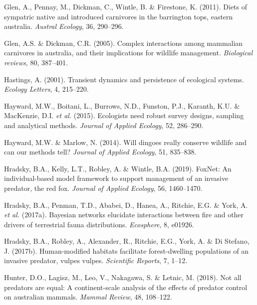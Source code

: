 \documentclass[]{elsarticle} %
\begin{document}
\leavevmode\hypertarget{ref-glen2011}{}%
Glen, A., Pennay, M., Dickman, C., Wintle, B. \& Firestone, K. (2011). Diets of sympatric native and introduced carnivores in the barrington tops, eastern australia. \emph{Austral Ecology}, 36, 290--296.

\leavevmode\hypertarget{ref-glen2005}{}%
Glen, A.S. \& Dickman, C.R. (2005). Complex interactions among mammalian carnivores in australia, and their implications for wildlife management. \emph{Biological reviews}, 80, 387--401.

\leavevmode\hypertarget{ref-hastings2001}{}%
Hastings, A. (2001). Transient dynamics and persistence of ecological systems. \emph{Ecology Letters}, 4, 215--220.

\leavevmode\hypertarget{ref-hayward2015}{}%
Hayward, M.W., Boitani, L., Burrows, N.D., Funston, P.J., Karanth, K.U. \& MacKenzie, D.I. \emph{et al.} (2015). Ecologists need robust survey designs, sampling and analytical methods. \emph{Journal of Applied Ecology}, 52, 286--290.

\leavevmode\hypertarget{ref-https:ux2fux2fdoi.orgux2f10.1111ux2f1365-2664.12250}{}%
Hayward, M.W. \& Marlow, N. (2014). Will dingoes really conserve wildlife and can our methods tell? \emph{Journal of Applied Ecology}, 51, 835--838.

\leavevmode\hypertarget{ref-hradsky2019foxnet}{}%
Hradsky, B.A., Kelly, L.T., Robley, A. \& Wintle, B.A. (2019). FoxNet: An individual-based model framework to support management of an invasive predator, the red fox. \emph{Journal of Applied Ecology}, 56, 1460--1470.

\leavevmode\hypertarget{ref-hradsky2017bayesian}{}%
Hradsky, B.A., Penman, T.D., Ababei, D., Hanea, A., Ritchie, E.G. \& York, A. \emph{et al.} (2017a). Bayesian networks elucidate interactions between fire and other drivers of terrestrial fauna distributions. \emph{Ecosphere}, 8, e01926.

\leavevmode\hypertarget{ref-hradsky2017human}{}%
Hradsky, B.A., Robley, A., Alexander, R., Ritchie, E.G., York, A. \& Di Stefano, J. (2017b). Human-modified habitats facilitate forest-dwelling populations of an invasive predator, vulpes vulpes. \emph{Scientific Reports}, 7, 1--12.

\leavevmode\hypertarget{ref-hunter2018}{}%
Hunter, D.O., Lagisz, M., Leo, V., Nakagawa, S. \& Letnic, M. (2018). Not all predators are equal: A continent-scale analysis of the effects of predator control on australian mammals. \emph{Mammal Review}, 48, 108--122.
\end{document}
